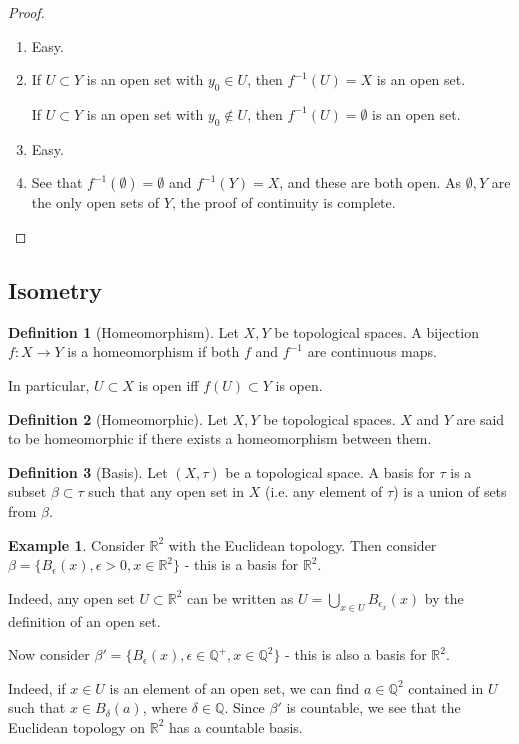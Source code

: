 \documentclass{article}
\theoremstyle{definition}
\newtheorem{defn}{Definition}[section]
\newtheorem{exmp}{Example}[section]
\theoremstyle{plain}%
\theoremstyle{remark}
\newcommand{\Union}{\bigcup}
\newcommand{\R}{\mathbb{R}}
\newcommand{\Q}{\mathbb{Q}}
\begin{document}
\begin{proof}
\begin{enumerate}
    \item Easy.
    \item If $U \subset Y$ is an open set with $y_0 \in U$, then $f^{-1}(U) = X$ is an open set.

    If $U \subset Y$ is an open set with $y_0 \not \in U$, then $f^{-1}(U) = \emptyset$ is an open set.
    \item Easy.
    \item See that $f^{-1}(\emptyset) = \emptyset$ and $f^{-1}(Y) = X$, and these are both open. As $\emptyset, Y$ are the only open sets of $Y$, the proof of continuity is complete.
\end{enumerate}
\end{proof}

\subsection{Isometry}

\begin{defn}[Homeomorphism]
Let $X, Y$ be topological spaces. A bijection $f: X \to Y$ is a homeomorphism if both $f$ and $f^{-1}$ are continuous maps.

In particular, $U \subset X$ is open iff $f(U) \subset Y$ is open.
\end{defn}

\begin{defn}[Homeomorphic]
Let $X, Y$ be topological spaces. $X$ and $Y$ are said to be homeomorphic if there exists a homeomorphism between them.
\end{defn}

\begin{defn}[Basis]
Let $(X, \tau)$ be a topological space. A basis for $\tau$ is a subset $\beta \subset \tau$ such that any open set in $X$ (i.e. any element of $\tau$) is a union of sets from $\beta$.
\end{defn}

\begin{exmp}
Consider $\R^2$ with the Euclidean topology. Then consider $\beta = \{ B_\epsilon(x), \epsilon > 0, x \in \R^2 \}$ - this is a basis for $\R^2$.

Indeed, any open set $U \subset \R^2$ can be written as $U = \Union_{x \in U} B_{\epsilon_x}(x)$ by the definition of an open set.

Now consider $\beta' = \{ B_\epsilon(x), \epsilon \in \Q^{+}, x \in \Q^2 \}$ - this is also a basis for $\R^2$.

Indeed, if $x \in U$ is an element of an open set, we can find $a \in \Q^2$ contained in $U$ such that $x \in B_\delta(a)$, where $\delta \in \Q$. Since $\beta'$ is countable, we see that the Euclidean topology on $\R^2$ has a countable basis.
\end{exmp}
\end{document}
